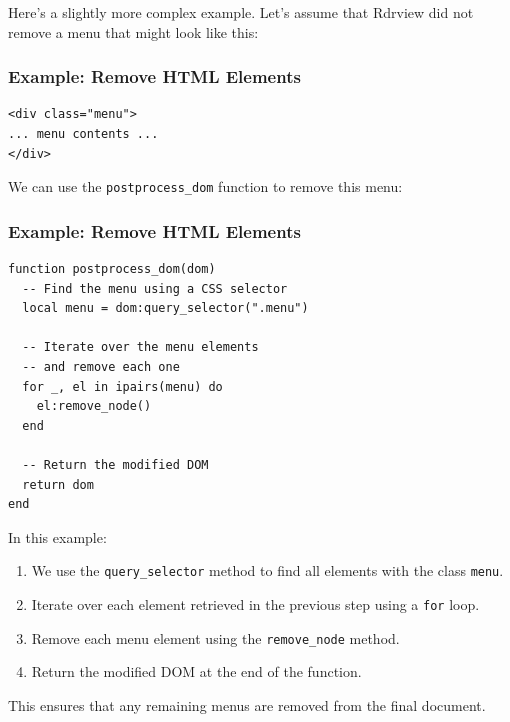 Here's a slightly more complex example. Let's assume that Rdrview did
not remove a menu that might look like this:

\begin{frame}[fragile]
  \frametitle{Example: Remove HTML Elements}
\begin{verbatim}
<div class="menu">
... menu contents ...
</div>
\end{verbatim}
\end{frame}


We can use the \texttt{postprocess\_dom} function to remove this menu:

\begin{frame}[fragile]
  \frametitle{Example: Remove HTML Elements}
\begin{verbatim}
function postprocess_dom(dom)
  -- Find the menu using a CSS selector
  local menu = dom:query_selector(".menu")

  -- Iterate over the menu elements 
  -- and remove each one
  for _, el in ipairs(menu) do
    el:remove_node()
  end
  
  -- Return the modified DOM
  return dom
end
\end{verbatim}
\end{frame}

In this example:

\begin{enumerate}
  \item We use the \texttt{query\_selector} method to find all elements with
    the class \texttt{menu}.
  \item Iterate over each element retrieved in the previous step
    using a \texttt{for} loop.
  \item Remove each menu element using the \texttt{remove\_node} method.
  \item Return the modified DOM at the end of the function.
\end{enumerate}

This ensures that any remaining menus are removed from the final document.



